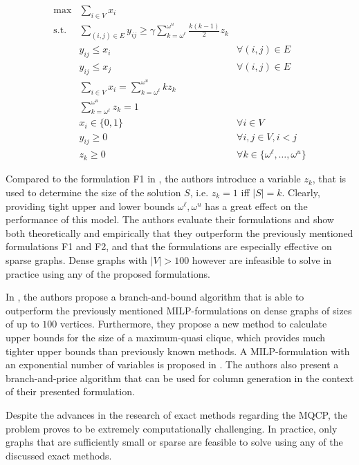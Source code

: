 \documentclass[draft,final]{vutinfth} %
\begin{document}
\begin{align}
    \max & \sum_{i \in V} x_i \\
    \text{s.t.} & \sum_{(i,j) \in E} y_{ij} \geq \gamma \sum_{k = \omega^{\ell}}^{\omega^u} \frac{k(k-1)}{2} z_k \\
    & y_{ij} \leq x_i & \forall(i,j) \in E \\
    & y_{ij} \leq x_j & \forall(i,j) \in E \\
    & \sum_{i \in V} x_i = \sum_{k = \omega^{\ell}}^{\omega^u} k z_k & \\
    & \sum_{k = \omega^{\ell}}^{\omega^u} z_k = 1 \\
    & x_i \in \{0,1\} & \forall i \in V \\
    & y_{ij} \geq 0 & \forall i, j \in V, i < j\\
    & z_k \geq 0 & \forall k \in \{\omega^{\ell}, \dots, \omega^u\}
\end{align}

Compared to the formulation F1 in \cite{pattillo_maximum_2013}, the authors introduce a variable $z_k$, that is used to determine the size of the solution $S$, i.e. $z_k = 1$ iff $|S| = k$. Clearly, providing tight upper and lower bounds $\omega^{\ell}, \omega^u$ has a great effect on the performance of this model. The authors evaluate their formulations and show both theoretically and empirically that they outperform the previously mentioned formulations F1 and F2, and that the formulations are especially effective on sparse graphs. Dense graphs with $|V| > 100$ however are infeasible to solve in practice using any of the proposed formulations. 

In \cite{ribeiro_exact_2019}, the authors propose a branch-and-bound algorithm that is able to outperform the previously mentioned MILP-formulations on dense graphs of sizes of up to $100$ vertices. Furthermore, they propose a new method to calculate upper bounds for the size of a maximum-quasi clique, which provides much tighter upper bounds than previously known methods. A MILP-formulation with an exponential number of variables is proposed in \cite{marinelli_lp-based_2021}. The authors also present a branch-and-price algorithm that can be used for column generation in the context of their presented formulation. 

Despite the advances in the research of exact methods regarding the MQCP, the problem proves to be extremely computationally challenging. In practice, only graphs that are sufficiently small or sparse are feasible to solve using any of the discussed exact methods. 
\end{document}
